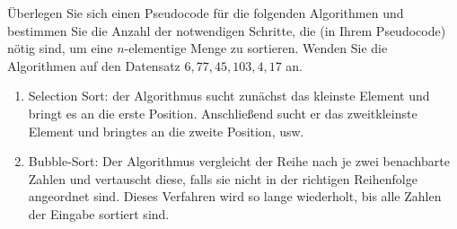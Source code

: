 
\begin{exercise}

Überlegen Sie sich einen Pseudocode für die folgenden Algorithmen und bestimmen Sie die Anzahl der notwendigen Schritte, die (in Ihrem Pseudocode) nötig sind, um eine $n$-elementige Menge zu sortieren.
Wenden Sie die Algorithmen auf den Datensatz $6, 77, 45, 103, 4, 17$ an.

\begin{enumerate}[label = (\alph*)]

    \item Selection Sort:
    der Algorithmus sucht zunächst das kleinste Element und bringt es an die erste Position.
    Anschließend sucht er das zweitkleinste Element und bringtes an die zweite Position, usw.

    \item Bubble-Sort:
    Der Algorithmus vergleicht der Reihe nach je zwei benachbarte Zahlen und vertauscht diese, falls sie nicht in der richtigen Reihenfolge angeordnet sind.
    Dieses Verfahren wird so lange wiederholt, bis alle Zahlen der Eingabe sortiert sind.

\end{enumerate}

\end{exercise}


